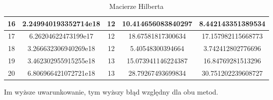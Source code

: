 \documentclass[15pt, a4paper]{article}
\begin{document}
\begin{table}[ht]
\begin{adjustbox}{max width=\textwidth}
\begin{tabular}{|c|c|c|c|c|}
        16 & 2.249940193352714e18  & 12 & 10.414656083840297         & 8.442143351389534            \\ \hline
        17 & 6.26204622473199e17   & 12 & 18.67581817300634          & 17.157982115668773           \\ \hline
        18 & 3.266632306940269e18  & 12 & 5.40548300394664           & 3.742412802776696            \\ \hline
        19 & 3.462302955915255e18  & 13 & 15.073941146224387         & 16.84769281513296            \\ \hline
        20 & 6.806966421072721e18  & 13 & 28.79267493699834 & 30.751202239608727           \\ \hline
           \end{tabular}
    \end{adjustbox}
    \label{tab:hilbert}
    \caption{Macierze Hilberta}
\end{table}

\noindent Im wyższe uwarunkowanie, tym wyższy błąd względny dla obu metod.

\vspace{0.5cm}

\pagebreak
\end{document}
